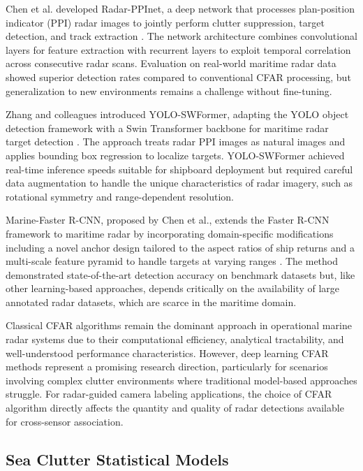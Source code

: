 Chen et al. developed Radar-PPInet, a deep network that processes plan-position indicator (PPI) radar images to jointly perform clutter suppression, target detection, and track extraction \cite{Chen2021}. The network architecture combines convolutional layers for feature extraction with recurrent layers to exploit temporal correlation across consecutive radar scans. Evaluation on real-world maritime radar data showed superior detection rates compared to conventional CFAR processing, but generalization to new environments remains a challenge without fine-tuning.

Zhang and colleagues introduced YOLO-SWFormer, adapting the YOLO object detection framework with a Swin Transformer backbone for maritime radar target detection \cite{Zhang2023b}. The approach treats radar PPI images as natural images and applies bounding box regression to localize targets. YOLO-SWFormer achieved real-time inference speeds suitable for shipboard deployment but required careful data augmentation to handle the unique characteristics of radar imagery, such as rotational symmetry and range-dependent resolution.

Marine-Faster R-CNN, proposed by Chen et al., extends the Faster R-CNN framework to maritime radar by incorporating domain-specific modifications including a novel anchor design tailored to the aspect ratios of ship returns and a multi-scale feature pyramid to handle targets at varying ranges \cite{Chen2022}. The method demonstrated state-of-the-art detection accuracy on benchmark datasets but, like other learning-based approaches, depends critically on the availability of large annotated radar datasets, which are scarce in the maritime domain.

Classical CFAR algorithms remain the dominant approach in operational marine radar systems due to their computational efficiency, analytical tractability, and well-understood performance characteristics. However, deep learning CFAR methods represent a promising research direction, particularly for scenarios involving complex clutter environments where traditional model-based approaches struggle. For radar-guided camera labeling applications, the choice of CFAR algorithm directly affects the quantity and quality of radar detections available for cross-sensor association.

\subsection{Sea Clutter Statistical Models}

